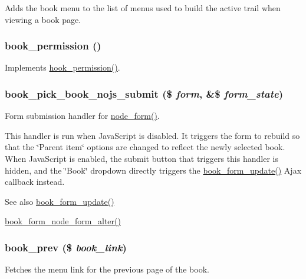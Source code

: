 Adds the book menu to the list of menus used to build the active trail when viewing a book page. \hypertarget{book_8module_ac6438df768a5d96010eef0f86950d41e}{
\subsubsection[{book\_\-permission}]{\setlength{\rightskip}{0pt plus 5cm}book\_\-permission ()}}
\label{book_8module_ac6438df768a5d96010eef0f86950d41e}
Implements \hyperlink{group__hooks_ga2b22b45f4925f2478412477bae329713}{hook\_\-permission()}. \hypertarget{book_8module_af0244d9baf8107c2b7fff3478801f424}{
\subsubsection[{book\_\-pick\_\-book\_\-nojs\_\-submit}]{\setlength{\rightskip}{0pt plus 5cm}book\_\-pick\_\-book\_\-nojs\_\-submit (\$ {\em form}, \/  \&\$ {\em form\_\-state})}}
\label{book_8module_af0244d9baf8107c2b7fff3478801f424}
Form submission handler for \hyperlink{group__forms_ga267299500e205db099ee4e8396769d3f}{node\_\-form()}.

This handler is run when JavaScript is disabled. It triggers the form to rebuild so that the \char`\"{}Parent item\char`\"{} options are changed to reflect the newly selected book. When JavaScript is enabled, the submit button that triggers this handler is hidden, and the \char`\"{}Book\char`\"{} dropdown directly triggers the \hyperlink{book_8module_a2790b0d5752cf56b0e06bd2a16a380e1}{book\_\-form\_\-update()} Ajax callback instead.

\begin{DoxySeeAlso}{See also}
\hyperlink{book_8module_a2790b0d5752cf56b0e06bd2a16a380e1}{book\_\-form\_\-update()} 

\hyperlink{book_8module_a239587a26d87e8231f7af9953a1db4dd}{book\_\-form\_\-node\_\-form\_\-alter()} 
\end{DoxySeeAlso}
\hypertarget{book_8module_ad576bb53cdddbf776c222d80df42d7f4}{
\subsubsection[{book\_\-prev}]{\setlength{\rightskip}{0pt plus 5cm}book\_\-prev (\$ {\em book\_\-link})}}
\label{book_8module_ad576bb53cdddbf776c222d80df42d7f4}
Fetches the menu link for the previous page of the book.


